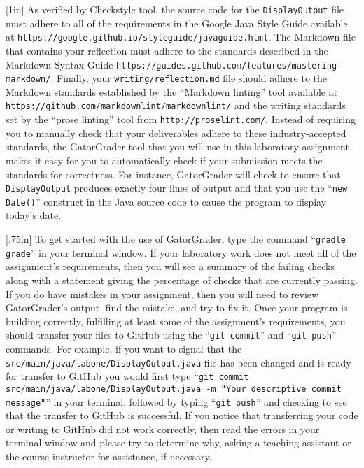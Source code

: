 \documentclass[11pt]{article}
\newcommand{\mainprogram}{\lstinline{DisplayOutput}}
\newcommand{\mainprogramsource}{\lstinline{src/main/java/labone/DisplayOutput.java}}
\newcommand{\reflection}{\lstinline{writing/reflection.md}}
\newcommand{\gatorgraderstart}{\command{gradle grade}}
\newcommand{\gitcommit}{\command{git commit}}
\newcommand{\gitpush}{\command{git push}}
\newcommand{\gitcommitmainprogram}{\command{git commit src/main/java/labone/DisplayOutput.java -m "Your
descriptive commit message"}}
\newcommand{\command}[1]{``\lstinline{#1}''}
\newcommand{\url}[1]{\lstinline{#1}}
\newcommand{\step}[1]{``{#1}''}
\newcommand{\caution}[1]{\null\hfill\LARGE{\faWarning{}}\newline\scriptsize{\em{#1}}}
\newcommand{\resource}[1]{\null\hfill\LARGE{\faLink{}}\newline\scriptsize{\em{#1}}}
\begin{document}
\marginnote{\resource{Study style guides}}[1in] As verified by Checkstyle
tool, the source code for the \mainprogram{} file must adhere to all of the
requirements in the Google Java Style Guide available at
\url{https://google.github.io/styleguide/javaguide.html}. The Markdown file
that contains your reflection must adhere to the standards described in the
Markdown Syntax Guide
\url{https://guides.github.com/features/mastering-markdown/}. Finally, your
\reflection{} file should adhere to the Markdown standards established by the
\step{Markdown linting} tool available at
\url{https://github.com/markdownlint/markdownlint/} and the writing standards
set by the \step{prose linting} tool from \url{http://proselint.com/}. Instead
of requiring you to manually check that your deliverables adhere to these
industry-accepted standards, the GatorGrader tool that you will use in this
laboratory assignment makes it easy for you to automatically check if your
submission meets the standards for correctness. For instance, GatorGrader will
check to ensure that \mainprogram{} produces exactly four lines of output and
that you use the \command{new Date()} construct in the Java source code to
cause the program to display today's date.

\marginnote{\caution{Write useful commits}}[.75in] To get started with the use
of GatorGrader, type the command \gatorgraderstart{} in your terminal window. If
your laboratory work does not meet all of the assignment's requirements, then
you will see a summary of the failing checks along with a statement giving the
percentage of checks that are currently passing. If you do have mistakes in your
assignment, then you will need to review GatorGrader's output, find the mistake,
and try to fix it. Once your program is building correctly, fulfilling at least
some of the assignment's requirements, you should transfer your files to GitHub
using the \gitcommit{} and \gitpush{} commands. For example, if you want to
signal that the \mainprogramsource{} file has been changed and is ready for
transfer to GitHub you would first type \gitcommitmainprogram{} in your
terminal, followed by typing \gitpush{} and checking to see that the transfer to
GitHub is successful. If you notice that transferring your code or writing to
GitHub did not work correctly, then read the errors in your terminal window and
please try to determine why, asking a teaching assistant or the course
instructor for assistance, if necessary.
\end{document}
